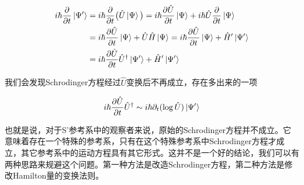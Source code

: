 \documentclass[a4paper]{article}
\begin{document}
        \begin{equation}
            \begin{split}
                i\hbar\frac{\partial}{\partial t}\ket{\Psi'} &= i\hbar\frac{\partial}{\partial t}\big(\hat{U}\ket{\Psi}\big) = i\hbar\frac{\partial\hat{U}}{\partial t}\ket{\Psi} + i\hbar\hat{U}\frac{\partial}{\partial t}\ket{\Psi} \\
                    &= i\hbar\frac{\partial\hat{U}}{\partial t}\ket{\Psi} + \hat{U}\hat{H}\ket{\Psi} = i\hbar\frac{\partial\hat{U}}{\partial t}\ket{\Psi} + \hat{H}'\ket{\Psi'} \\
                    &= i\hbar\frac{\partial\hat{U}}{\partial t}\hat{U}^\dagger\ket{\Psi'} + \hat{H}'\ket{\Psi'}
            \end{split}
        \end{equation}
        
        我们会发现Schrodinger方程经过$\hat{U}$变换后不再成立，存在多出来的一项
        
        \begin{equation}
            i\hbar\frac{\partial\hat{U}}{\partial t}\hat{U}^\dagger\sim i\hbar\partial_t(\log\hat{U})\ket{\Psi'}
        \end{equation}

        也就是说，对于S'参考系中的观察者来说，原始的Schrodinger方程并不成立。它意味着存在一个特殊的参考系，只有在这个特殊参考系中Schrodinger方程才成立，其它参考系中的运动方程具有其它形式。这并不是一个好的结论，我们可以有两种思路来规避这个问题。第一种方法是改造Schrodinger方程，第二种方法是修改Hamilton量的变换法则。
\end{document}
